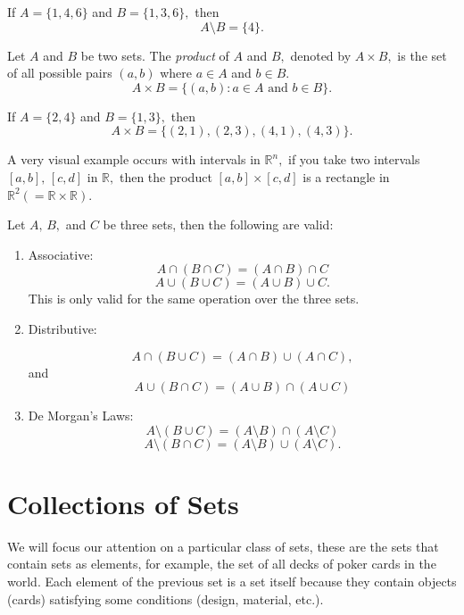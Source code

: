 \documentclass[
	fontsize=10pt, %
	twoside=false, %
	secnumdepth=1, %
]{kaobook}
\begin{document}
\begin{example}
If $A=\{1,4,6\}$ and $B=\{1,3,6\},$ then $$A\setminus B=\{4\}.$$
\end{example}


\begin{definition}[Product]
Let $A$ and $B$ be two sets. The \emph{product} of $A$ and $B,$ denoted by $A\times B,$ is the set of all possible pairs $(a,b)$ where $a\in A$ and $b\in B.$ $$A\times B =\{(a,b): a\in A\mbox{ and }b\in B\}.$$
\end{definition}

\begin{example}
If $A=\{2,4\}$ and $B=\{1,3\},$ then $$A\times B=\{(2,1),(2,3),(4,1),(4,3)\}.$$
\end{example}

A very visual example occurs with intervals in $\mathbb{R}^n,$ if you take two intervals $[a,b],\,[c,d]$ in $\mathbb{R},$ then the product $[a,b]\times [c,d]$ is a rectangle in $\mathbb{R}^2 (=\mathbb{R}\times \mathbb{R}).$

\begin{lemma}
Let $A,\, B,$ and $C$ be three sets, then the following are valid:
\begin{enumerate}
\item Associative: $$A\cap(B\cap C)=(A\cap B)\cap C$$ $$A\cup(B\cup C)=(A\cup B)\cup C.$$
This is only valid for the same operation over the three sets.

\item Distributive:

$$A\cap(B\cup C)=(A\cap B)\cup (A\cap C),$$ and $$A\cup(B\cap C)=(A\cup B)\cap (A\cup C)$$

\item De Morgan's Laws: $$A \setminus (B\cup C) = (A\setminus B)\cap (A\setminus C)$$ $$A\setminus (B\cap C) =(A \setminus B)\cup (A\setminus C).$$
\end{enumerate}
\end{lemma}

\section{Collections of Sets}

We will focus our attention on a particular class of sets, these are the sets that contain sets as elements, for example, the set of all decks of poker cards in the world. Each element of the previous set is a set itself because they contain objects (cards) satisfying some conditions (design, material, etc.).
\end{document}
